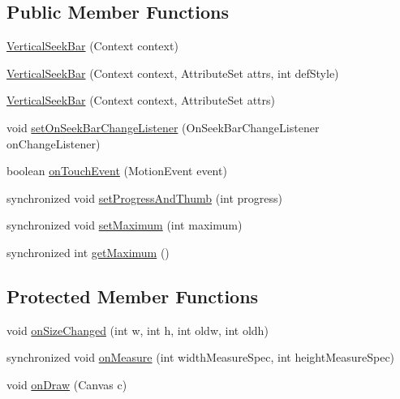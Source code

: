 \subsection*{Public Member Functions}
\begin{DoxyCompactItemize}
\item 
\hyperlink{classandroid_1_1app_1_1printerapp_1_1util_1_1ui_1_1_vertical_seek_bar_af563e548486cd441e25e939bef764f0f}{Vertical\+Seek\+Bar} (Context context)
\item 
\hyperlink{classandroid_1_1app_1_1printerapp_1_1util_1_1ui_1_1_vertical_seek_bar_a1369e487a5e2b0f7736828950de2b95e}{Vertical\+Seek\+Bar} (Context context, Attribute\+Set attrs, int def\+Style)
\item 
\hyperlink{classandroid_1_1app_1_1printerapp_1_1util_1_1ui_1_1_vertical_seek_bar_a8c09a5f348c8cf96dd21e4a0f929000c}{Vertical\+Seek\+Bar} (Context context, Attribute\+Set attrs)
\item 
void \hyperlink{classandroid_1_1app_1_1printerapp_1_1util_1_1ui_1_1_vertical_seek_bar_ac87eb576b1372be2488b3fc1bd3abcb2}{set\+On\+Seek\+Bar\+Change\+Listener} (On\+Seek\+Bar\+Change\+Listener on\+Change\+Listener)
\item 
boolean \hyperlink{classandroid_1_1app_1_1printerapp_1_1util_1_1ui_1_1_vertical_seek_bar_afd7acf812b953260ea9ccd5a0f8bea16}{on\+Touch\+Event} (Motion\+Event event)
\item 
synchronized void \hyperlink{classandroid_1_1app_1_1printerapp_1_1util_1_1ui_1_1_vertical_seek_bar_a52ece9bfc11a792717fda682ee6f0d30}{set\+Progress\+And\+Thumb} (int progress)
\item 
synchronized void \hyperlink{classandroid_1_1app_1_1printerapp_1_1util_1_1ui_1_1_vertical_seek_bar_a5381cf16e7b7596523822a47e4040b17}{set\+Maximum} (int maximum)
\item 
synchronized int \hyperlink{classandroid_1_1app_1_1printerapp_1_1util_1_1ui_1_1_vertical_seek_bar_a6081c59dd4ea3380be3a667db4c71412}{get\+Maximum} ()
\end{DoxyCompactItemize}
\subsection*{Protected Member Functions}
\begin{DoxyCompactItemize}
\item 
void \hyperlink{classandroid_1_1app_1_1printerapp_1_1util_1_1ui_1_1_vertical_seek_bar_afbd9fe8f09a375422a971c3296421824}{on\+Size\+Changed} (int w, int h, int oldw, int oldh)
\item 
synchronized void \hyperlink{classandroid_1_1app_1_1printerapp_1_1util_1_1ui_1_1_vertical_seek_bar_a1354607fd2bd5f1c5f404f6f51b5df4c}{on\+Measure} (int width\+Measure\+Spec, int height\+Measure\+Spec)
\item 
void \hyperlink{classandroid_1_1app_1_1printerapp_1_1util_1_1ui_1_1_vertical_seek_bar_a4c0afda9acc9ba1a077b58af3d3425c6}{on\+Draw} (Canvas c)
\end{DoxyCompactItemize}


